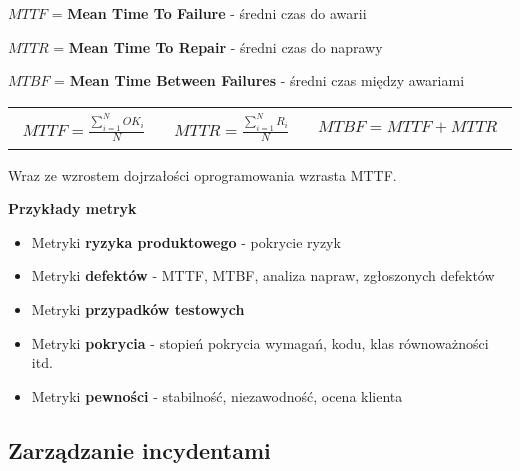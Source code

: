\documentclass[../main.tex]{subfiles}
\begin{document}
    $MTTF$ = \textbf{Mean Time To Failure} - średni czas do awarii

    $MTTR$ = \textbf{Mean Time To Repair} - średni czas do naprawy

    $MTBF$ = \textbf{Mean Time Between Failures} - średni czas między awariami

    \begin{table}[H]
        \begin{center}
            \begin{tabular}{p{5cm} p{5cm} p{5cm}}
                \begin{align*}
                    MTTF = \frac{\sum_{i=1}^{N} OK_i}{N}
                \end{align*}
                &
                \begin{align*}
                    MTTR = \frac{\sum_{i=1}^{N} R_i}{N}
                \end{align*}
                &
                \begin{align*}
                    MTBF = MTTF + MTTR
                \end{align*}
            \end{tabular}
        \end{center}
    \end{table}
    Wraz ze wzrostem dojrzałości oprogramowania wzrasta MTTF.

    \textbf{Przykłady metryk}
    \begin{itemize}
        \item Metryki \textbf{ryzyka produktowego} - pokrycie ryzyk
        \item Metryki \textbf{defektów} - MTTF, MTBF, analiza napraw, zgłoszonych defektów
        \item Metryki \textbf{przypadków testowych}
        \item Metryki \textbf{pokrycia} - stopień pokrycia wymagań, kodu, klas równoważności itd.
        \item Metryki \textbf{pewności} - stabilność, niezawodność, ocena klienta
    \end{itemize}

    \subsection{Zarządzanie incydentami}
\end{document}
